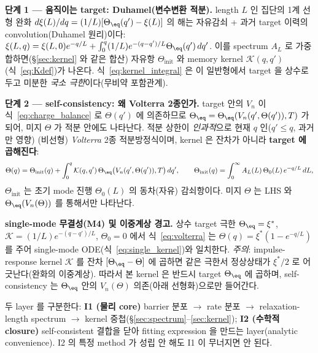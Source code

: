 \textbf{단계 1 — 움직이는 target: Duhamel(변수변환 적분).} length $L$ 인 집단의 1계 선형 완화
$d\xi(L)/dq=(1/L)[\Theta_\eq(q')-\xi(L)]$ 의 해는 자유감쇠 + 과거 target 이력의 convolution(Duhamel
원리)이다: $\xi(L,q)=\xi(L,0)e^{-q/L}+\int_0^q (1/L)e^{-(q-q')/L}\Theta_\eq(q')\,dq'$. 이를 spectrum
$A_L$ 로 가중합하면(\S\ref{sec:kernel} 와 같은 합산) 자유항 $\Theta_\mathrm{init}$ 와 memory kernel
$\mathcal K(q,q')$(식~\eqref{eq:Kdef})가 나온다. 식~\eqref{eq:kernel_integral} 은 이 일반형에서 target 을
상수로 두고 미분한 \emph{국소 극한}이다(무비약 포함관계).

\textbf{단계 2 — self-consistency: 왜 Volterra 2종인가.} target 안의 $V_n$ 이 식~\eqref{eq:charge_balance}
로 $\Theta(q')$ 에 의존하므로 $\Theta_\eq=\Theta_\eq(V_n(q',\Theta(q')),T)$ 가 되어, 미지 $\Theta$ 가 적분
안에도 나타난다. 적분 상한이 \emph{인과적}으로 현재 $q$ 인($q'\le q$, 과거만 영향) (비선형) \emph{Volterra}
2종 적분방정식이며, kernel 은 잔차가 아니라 \textbf{target 에 곱해진다}:
\begin{equation}
\Theta(q)=\Theta_\mathrm{init}(q)+\int_0^q \mathcal K(q,q')\,\Theta_\eq\big(V_n(q',\Theta(q')),T\big)\,dq',
\qquad \Theta_\mathrm{init}(q)=\int_0^\infty A_L(L)\,\Theta_0(L)\,e^{-q/L}\,dL,
\label{eq:volterra}
\end{equation}
$\Theta_\mathrm{init}$ 는 초기 mode 진행 $\Theta_0(L)$ 의 동차(자유) 감쇠항이다. 미지 $\Theta$ 는 LHS 와
$\Theta_\eq(V_n(\Theta))$ 를 통해서만 나타난다.
\begin{boundbox}
\textbf{single-mode 무결성(M4) 및 이중계상 경고.} 상수 target 극한 $\Theta_\eq=\xi^\ast$,
$\mathcal K=(1/L)e^{-(q-q')/L}$, $\Theta_0=0$ 에서 식~\eqref{eq:volterra} 는
$\Theta(q)=\xi^\ast(1-e^{-q/L})$ 를 주어 single-mode ODE(식~\eqref{eq:single_kernel})와 일치한다.
\emph{주의}: impulse-response kernel $\mathcal K$ 를 잔차 $[\Theta_\eq-\Theta]$ 에 곱하면 같은 극한서
정상상태가 $\xi^\ast/2$ 로 어긋난다(완화의 이중계상). 따라서 본 kernel 은 반드시 target $\Theta_\eq$ 에
곱하며, self-consistency 는 $\Theta_\eq$ 안의 $V_n(\Theta)$ 의존(아래 선형화)으로만 들어간다.
\end{boundbox}
두 layer 를 구분한다: \textbf{I1 (물리 core)} barrier 분포 $\to$ rate 분포 $\to$ relaxation-length
spectrum $\to$ kernel 중첩(\S\ref{sec:spectrum}--\ref{sec:kernel}); \textbf{I2 (수학적 closure)}
self-consistent 결합을 닫아 fitting expression 을 만드는 layer(analytic convenience). I2 의 특정 method 가
성립 안 해도 I1 이 무너지면 안 된다.

